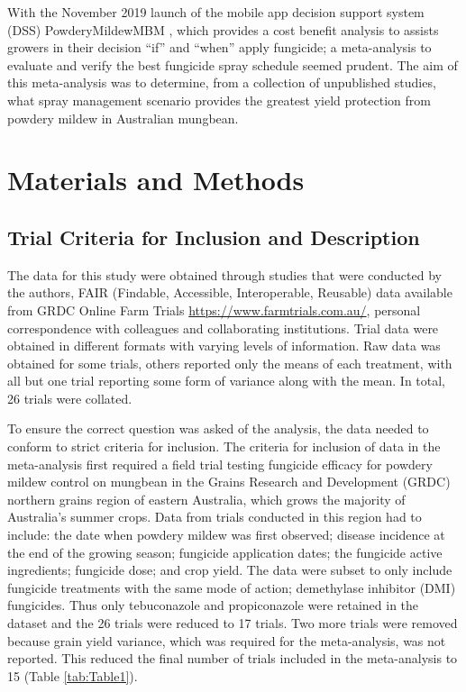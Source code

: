 \documentclass[agronomy,article,submit,moreauthors,pdftex]{mdpi}
\begin{document}
With the November 2019 launch of the mobile app decision support system (DSS) PowderyMildewMBM \citep{Diggle}, which provides a cost benefit analysis to assists growers in their decision ``if'' and ``when'' apply fungicide; a meta-analysis to evaluate and verify the best fungicide spray schedule seemed prudent.
The aim of this meta-analysis was to determine, from a collection of unpublished studies, what spray management scenario provides the greatest yield protection from powdery mildew in Australian mungbean.

\hypertarget{materials-and-methods}{%
\section{Materials and Methods}\label{materials-and-methods}}

\hypertarget{trial-criteria-for-inclusion-and-description}{%
\subsection{Trial Criteria for Inclusion and Description}\label{trial-criteria-for-inclusion-and-description}}

The data for this study were obtained through studies that were conducted by the authors, FAIR (Findable, Accessible, Interoperable, Reusable) data available from GRDC Online Farm Trials \url{https://www.farmtrials.com.au/}, personal correspondence with colleagues and collaborating institutions.
Trial data were obtained in different formats with varying levels of information.
Raw data was obtained for some trials, others reported only the means of each treatment, with all but one trial reporting some form of variance along with the mean.
In total, 26 trials were collated.

To ensure the correct question was asked of the analysis, the data needed to conform to strict criteria for inclusion.
The criteria for inclusion of data in the meta-analysis first required a field trial testing fungicide efficacy for powdery mildew control on mungbean in the Grains Research and Development (GRDC) northern grains region of eastern Australia, which grows the majority of Australia's summer crops.
Data from trials conducted in this region had to include: the date when powdery mildew was first observed; disease incidence at the end of the growing season; fungicide application dates; the fungicide active ingredients; fungicide dose; and crop yield.
The data were subset to only include fungicide treatments with the same mode of action; demethylase inhibitor (DMI) fungicides.
Thus only tebuconazole and propiconazole were retained in the dataset and the 26 trials were reduced to 17 trials.
Two more trials were removed because grain yield variance, which was required for the meta-analysis, was not reported.
This reduced the final number of trials included in the meta-analysis to 15 (Table \ref{tab:Table1}).
\end{document}
